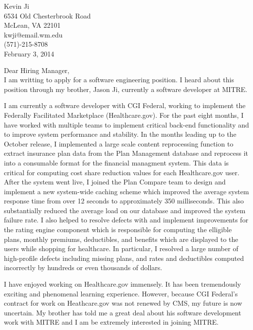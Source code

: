 \documentclass[10pt,letterpaper]{article}
\begin{document}
 

\begin{flushright} 
Kevin Ji \\
6534 Old Chesterbrook Road \\
McLean, VA 22101 \\
kwji@email.wm.edu \\
(571)-215-8708
\\[\baselineskip]
February 3, 2014
\\[2\baselineskip]
\end{flushright}

Dear Hiring Manager,
\\[\baselineskip]
I am writting to apply for a software engineering position. I heard about this position through my brother, Jason Ji, currently a software developer at MITRE.

I am currently a software developer with CGI Federal, working to implement the Federally Facilitated Marketplace (Healthcare.gov). For the past eight months, I have worked with multiple teams to implement critical back-end functionality and to improve system performance and stability. In the months leading up to the October release, I implemented a large scale content reprocessing function to extract insurance plan data from the Plan Management database and reprocess it into a consumable format for the financial managment system. This data is critical for computing cost share reduction values for each Healthcare.gov user. After the system went live, I joined the Plan Compare team to design and implement a new system-wide caching scheme which improved the average system response time from over 12 seconds to approximately 350 milliseconds. This also substantially reduced the average load on our database and improved the system failure rate. I also helped to resolve defects with and implement improvements for the rating engine component which is responsible for computing the elligible plans, monthly premiums, deductibles, and benefits which are displayed to the users while shopping for healthcare. In particular, I resolved a large number of high-profile defects including missing plans, and rates and deductibles computed incorrectly by hundreds or even thousands of dollars. 

I have enjoyed working on Healthcare.gov immensely. It has been tremendously exciting and phenomenal learning experience. However, because CGI Federal's contract for work on Heathcare.gov was not renewed by CMS, my future is now uncertain. My brother has told me a great deal about his software development work with MITRE and I am be extremely interested in joining MITRE.
\end{document}
